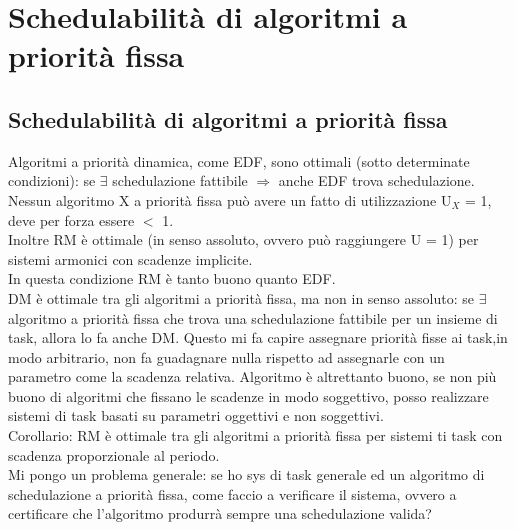 \documentclass[12pt, oneside]{extbook}
\begin{document}
\chapter{Schedulabilità di algoritmi a priorità fissa}

\section{Schedulabilità di algoritmi a priorità fissa}
Algoritmi a priorità dinamica, come EDF, sono ottimali (sotto determinate condizioni): se $\exists$ schedulazione fattibile $\Rightarrow$ anche EDF trova schedulazione.\\ Nessun algoritmo X a priorità fissa può avere un fatto di utilizzazione U$_{X}$ = 1, deve per forza essere $<$ 1.\\ Inoltre RM è ottimale (in senso assoluto, ovvero può raggiungere U = 1) per sistemi armonici con scadenze implicite.\\ In questa condizione RM è tanto buono quanto EDF.\\ DM è ottimale tra gli algoritmi a priorità fissa, ma non in senso assoluto: se $\exists$ algoritmo a priorità fissa che trova una schedulazione fattibile per un insieme di task, allora lo fa anche DM. Questo mi fa capire assegnare priorità fisse ai task,in modo arbitrario, non fa guadagnare nulla rispetto ad assegnarle con un parametro come la scadenza relativa. Algoritmo è altrettanto buono, se non più buono di algoritmi che fissano le scadenze in modo soggettivo, posso realizzare sistemi di task basati su parametri oggettivi e non soggettivi.\\ Corollario: RM è ottimale tra gli algoritmi a priorità fissa per sistemi ti task con scadenza proporzionale al periodo.\\ Mi pongo un problema generale: se ho sys di task generale ed un algoritmo di schedulazione a priorità fissa, come faccio a verificare il sistema, ovvero a certificare che l'algoritmo produrrà sempre una schedulazione valida?
\end{document}
